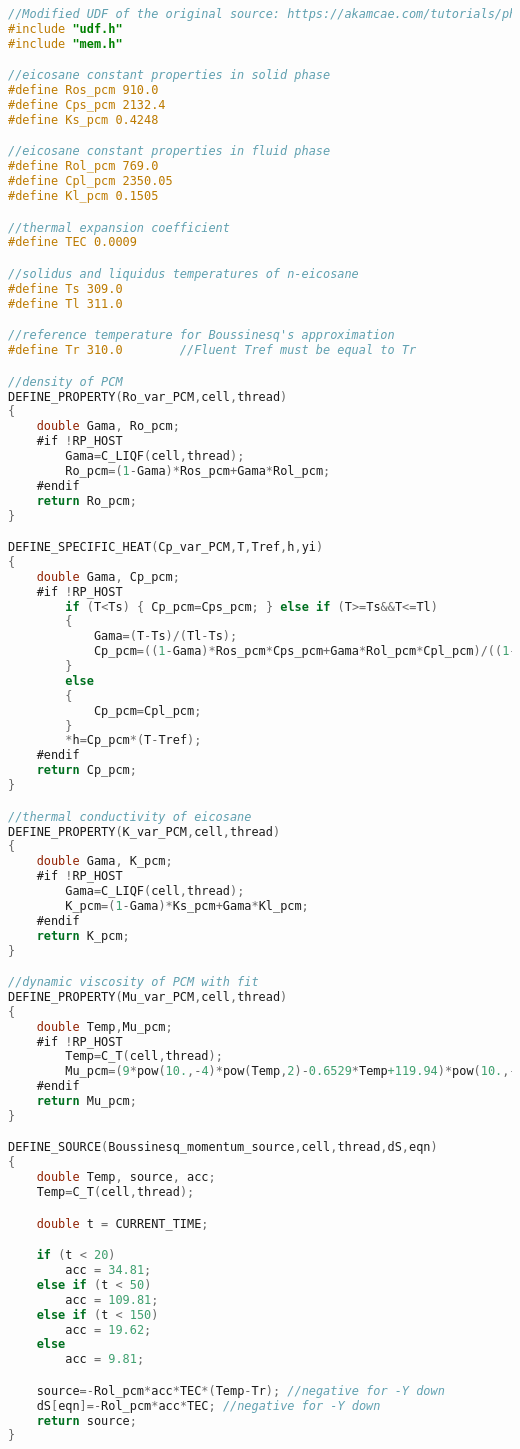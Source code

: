 \begin{lstlisting}[language=C, caption={Vollständige \ac{pcm} \ac{udf} eicosane.c}, label={lst:udf_rest}]
//Modified UDF of the original source: https://akamcae.com/tutorials/phase-change-material-simulation-in-ansys-fluent/
#include "udf.h"
#include "mem.h"

//eicosane constant properties in solid phase
#define Ros_pcm 910.0
#define Cps_pcm 2132.4
#define Ks_pcm 0.4248

//eicosane constant properties in fluid phase
#define Rol_pcm 769.0
#define Cpl_pcm 2350.05
#define Kl_pcm 0.1505

//thermal expansion coefficient
#define TEC 0.0009

//solidus and liquidus temperatures of n-eicosane
#define Ts 309.0
#define Tl 311.0

//reference temperature for Boussinesq's approximation
#define Tr 310.0		//Fluent Tref must be equal to Tr

//density of PCM
DEFINE_PROPERTY(Ro_var_PCM,cell,thread)
{
	double Gama, Ro_pcm;
	#if !RP_HOST
		Gama=C_LIQF(cell,thread);
		Ro_pcm=(1-Gama)*Ros_pcm+Gama*Rol_pcm;
	#endif
	return Ro_pcm;
}

DEFINE_SPECIFIC_HEAT(Cp_var_PCM,T,Tref,h,yi)
{
	double Gama, Cp_pcm;
	#if !RP_HOST
		if (T<Ts) { Cp_pcm=Cps_pcm; } else if (T>=Ts&&T<=Tl)
		{
			Gama=(T-Ts)/(Tl-Ts);
			Cp_pcm=((1-Gama)*Ros_pcm*Cps_pcm+Gama*Rol_pcm*Cpl_pcm)/((1-Gama)*Ros_pcm+Gama*Rol_pcm);
		}
		else
		{
			Cp_pcm=Cpl_pcm;
		}
		*h=Cp_pcm*(T-Tref);
	#endif
	return Cp_pcm;
}

//thermal conductivity of eicosane
DEFINE_PROPERTY(K_var_PCM,cell,thread)
{
	double Gama, K_pcm;
	#if !RP_HOST
		Gama=C_LIQF(cell,thread);
		K_pcm=(1-Gama)*Ks_pcm+Gama*Kl_pcm;
	#endif
	return K_pcm;
}

//dynamic viscosity of PCM with fit
DEFINE_PROPERTY(Mu_var_PCM,cell,thread)
{
	double Temp,Mu_pcm;
	#if !RP_HOST
		Temp=C_T(cell,thread);
		Mu_pcm=(9*pow(10.,-4)*pow(Temp,2)-0.6529*Temp+119.94)*pow(10.,-3);
	#endif
	return Mu_pcm;
}

DEFINE_SOURCE(Boussinesq_momentum_source,cell,thread,dS,eqn)
{
	double Temp, source, acc;
	Temp=C_T(cell,thread);

	double t = CURRENT_TIME;

	if (t < 20)
		acc = 34.81;
	else if (t < 50)
		acc = 109.81;
	else if (t < 150)
		acc = 19.62;
	else
		acc = 9.81;

	source=-Rol_pcm*acc*TEC*(Temp-Tr); //negative for -Y down
	dS[eqn]=-Rol_pcm*acc*TEC; //negative for -Y down
	return source;
}
\end{lstlisting}

